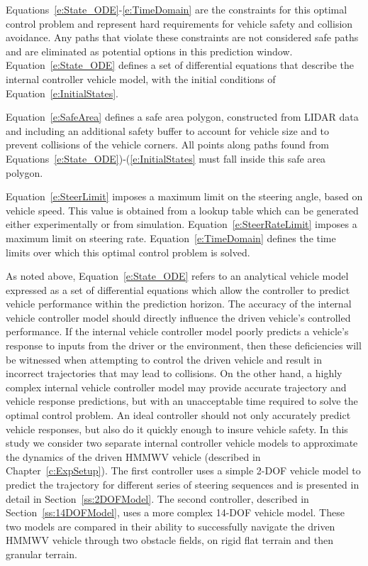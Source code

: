 \documentclass[12pt,onecolumn]{report}
\newcommand{\CHRONO}{{\sffamily{{Chrono}}}}
\begin{document}
Equations~\ref{e:State_ODE}-\ref{e:TimeDomain} are the constraints for this optimal control problem and represent hard requirements for vehicle safety and collision avoidance. Any paths that violate these constraints are not considered safe paths and are eliminated as potential options in this prediction window. Equation~\ref{e:State_ODE} defines a set of differential equations that describe the internal controller vehicle model, with the initial conditions of Equation~\ref{e:InitialStates}.

Equation~\ref{e:SafeArea} defines a safe area polygon, constructed from LIDAR data and including an additional safety buffer to account for vehicle size and to prevent collisions of the vehicle corners.  All points along paths found from Equations~\ref{e:State_ODE})-(\ref{e:InitialStates} must fall inside this safe area polygon.

Equation~\ref{e:SteerLimit} imposes a maximum limit on the steering angle, based on vehicle speed. This value is obtained from a lookup table which can be generated either experimentally or from simulation. Equation~\ref{e:SteerRateLimit} imposes a maximum limit on steering rate. Equation~\ref{e:TimeDomain} defines the time limits over which this optimal control problem is solved.

As noted above, Equation~\ref{e:State_ODE} refers to an analytical vehicle model expressed as a set of differential equations which allow the controller to predict vehicle performance within the prediction horizon. The accuracy of the internal vehicle controller model should directly influence the driven vehicle's controlled performance. If the internal vehicle controller model poorly predicts a vehicle's response to inputs from the driver or the environment, then these deficiencies will be witnessed when attempting to control the driven vehicle and result in incorrect trajectories that may lead to collisions. On the other hand, a highly complex internal vehicle controller model may provide accurate trajectory and vehicle response predictions, but with an unacceptable time required to solve the optimal control problem. An ideal controller should not only accurately predict vehicle responses, but also do it quickly enough to insure vehicle safety. 
In this study we consider two separate internal controller vehicle models to approximate the dynamics of the driven {\CHRONO} HMMWV vehicle (described in Chapter~\ref{c:ExpSetup}).  The first controller uses a simple 2-DOF vehicle model to predict the trajectory for different series of steering sequences and is presented in detail in Section~\ref{ss:2DOFModel}. The second controller, described in Section~\ref{ss:14DOFModel}, uses a more complex 14-DOF vehicle model. These two models are compared in their ability to successfully navigate the driven HMMWV vehicle through two obstacle fields, on rigid flat terrain and then granular terrain.
\end{document}
